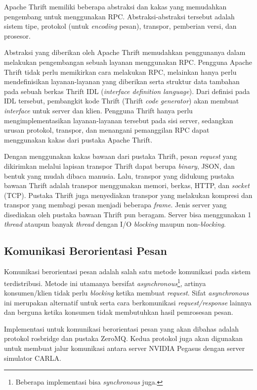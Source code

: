 Apache Thrift memiliki beberapa abstraksi dan kakas yang memudahkan pengembang
untuk menggunakan RPC. Abstraksi-abstraksi tersebut adalah sistem tipe, protokol
(untuk \textit{encoding} pesan), transpor, pemberian versi, dan prosesor.

Abstraksi yang diberikan oleh Apache Thrift memudahkan penggunanya dalam
me\-la\-ku\-kan pengembangan sebuah layanan menggunakan RPC. Pengguna Apache
Thrift tidak perlu memikirkan cara melakukan RPC, melainkan hanya perlu
men\-de\-fi\-ni\-si\-kan layanan-layanan yang diberikan serta struktur data
tambahan pada sebuah berkas Thrift IDL (\textit{interface definition language}).
Dari definisi pada IDL tersebut, pembangkit kode Thrift (Thrift \textit{code
    generator}) akan membuat \textit{interface} untuk server dan klien. Pengguna
Thrift hanya perlu mengimplementasikan layanan-layanan tersebut pada sisi
server, sedangkan urusan protokol, transpor, dan menangani pemanggilan RPC dapat
menggunakan kakas dari pustaka Apache Thrift.

Dengan menggunakan kakas bawaan dari pustaka Thrift, pesan \textit{request} yang
di\-ki\-rim\-kan melalui lapisan transpor Thrift dapat berupa \textit{binary},
JSON, dan bentuk yang mudah dibaca manusia. Lalu, transpor yang didukung pustaka
bawaan Thrift adalah transpor menggunakan memori, berkas, HTTP, dan
\textit{socket} (TCP). Pustaka Thrift juga menyediakan transpor yang melakukan
kompresi dan transpor yang membagi pesan menjadi beberapa \textit{frame}. Jenis
server yang disediakan oleh pustaka bawaan Thrift pun beragam. Server bisa
menggunakan 1 \textit{thread} ataupun banyak \textit{thread} dengan I/O
\textit{blocking} maupun non-\textit{blocking}.

\subsection{Komunikasi Berorientasi Pesan}

Komunikasi berorientasi pesan adalah salah satu metode komunikasi pada sistem
terdistribusi. Metode ini utamanya bersifat
\textit{asynchronous}\footnote{Beberapa implementasi bisa \textit{synchronous}
    juga.}, artinya konsumen/klien tidak perlu \textit{blocking} ketika membuat
\textit{request}. Sifat \textit{asynchronous} ini merupakan alternatif untuk
serta cara berkomunikasi \textit{request/response} lainnya dan berguna ketika
konsumen tidak membutuhkan hasil pemrosesan pesan.

Implementasi untuk komunikasi berorientasi pesan yang akan dibahas adalah
protokol rosbridge dan pustaka ZeroMQ. Kedua protokol juga akan digunakan untuk
membuat jalur komunikasi antara server NVIDIA Pegasus dengan server simulator
CARLA.

